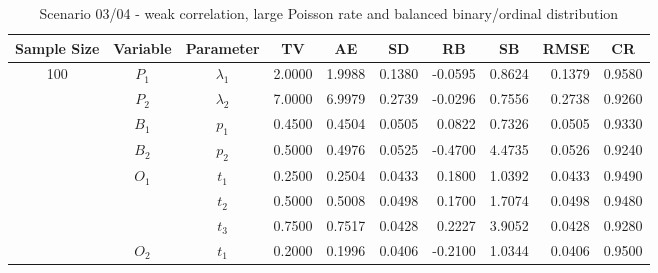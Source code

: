 \documentclass[letterpaper]{article}
\begin{document}
\begin{table}[h]
\centering
\caption{Scenario 03/04 - weak correlation, large Poisson rate and balanced binary/ordinal distribution}
\begin{tabular}{cccrrrrrrr}
\hline
Sample Size & Variable    & Parameter      & \multicolumn{1}{c}{TV} & \multicolumn{1}{c}{AE} & \multicolumn{1}{c}{SD} & \multicolumn{1}{c}{RB} & \multicolumn{1}{c}{SB} & \multicolumn{1}{c}{RMSE} & \multicolumn{1}{c}{CR} \\\hline
100         & $P_1$       & $\lambda_1$    & 2.0000                 & 1.9988                 & 0.1380                 & -0.0595                & 0.8624                 & 0.1379                   & 0.9580                 \\
            & $P_2$       & $\lambda_2$    & 7.0000                 & 6.9979                 & 0.2739                 & -0.0296                & 0.7556                 & 0.2738                   & 0.9260                 \\
            & $B_1$       & $p_1$          & 0.4500                 & 0.4504                 & 0.0505                 & 0.0822                 & 0.7326                 & 0.0505                   & 0.9330                 \\
            & $B_2$       & $p_2$          & 0.5000                 & 0.4976                 & 0.0525                 & -0.4700                & 4.4735                 & 0.0526                   & 0.9240                 \\
            & $O_1$       & $t_1$          & 0.2500                 & 0.2504                 & 0.0433                 & 0.1800                 & 1.0392                 & 0.0433                   & 0.9490                 \\
            &             & $t_2$          & 0.5000                 & 0.5008                 & 0.0498                 & 0.1700                 & 1.7074                 & 0.0498                   & 0.9480                 \\
            &             & $t_3$          & 0.7500                 & 0.7517                 & 0.0428                 & 0.2227                 & 3.9052                 & 0.0428                   & 0.9280                 \\
            & $O_2$       & $t_1$          & 0.2000                 & 0.1996                 & 0.0406                 & -0.2100                & 1.0344                 & 0.0406                   & 0.9500                 \\

\end{tabular}
\end{table}
\end{document}
